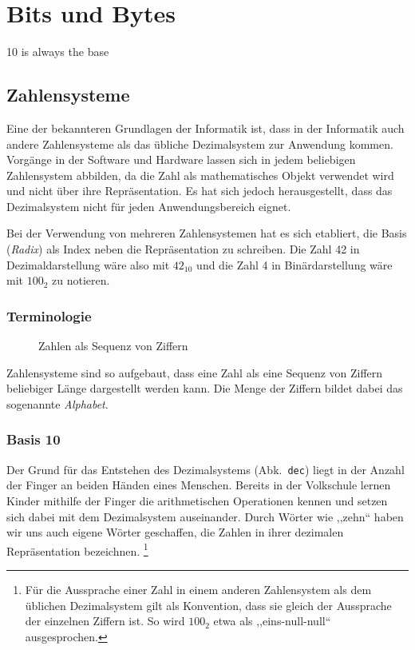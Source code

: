 \chapter{Bits und Bytes}
\epigraph{10 is always the base}{}
\newcommand{\short}[1]{Abk.~\texttt{#1}}
%
\section{Zahlensysteme}
%
Eine der bekannteren Grundlagen der Informatik ist, dass in der Informatik
auch andere Zahlensysteme als das übliche Dezimalsystem zur Anwendung kommen.
Vorgänge in der Software und Hardware lassen sich in jedem beliebigen
Zahlensystem abbilden, da die Zahl als mathematisches Objekt verwendet wird
und nicht über ihre Repräsentation. Es hat sich jedoch herausgestellt, dass das
Dezimalsystem nicht für jeden Anwendungsbereich eignet.

Bei der Verwendung von mehreren Zahlensystemen hat es sich etabliert,
die Basis (\emph{Radix}) als Index neben die Repräsentation zu schreiben.
Die Zahl 42 in Dezimaldarstellung wäre also mit $42_{10}$ und die Zahl 4
in Binärdarstellung wäre mit $100_2$ zu notieren.
%
\subsection{Terminologie}
%
\begin{figure}[ht]
  \begin{center}
  \end{center}
  \caption{Zahlen als Sequenz von Ziffern}
  \label{fig:seq_digits}
\end{figure}

Zahlensysteme sind so aufgebaut, dass eine Zahl als eine Sequenz von Ziffern
beliebiger Länge dargestellt werden kann. Die Menge der Ziffern bildet dabei
das sogenannte \emph{Alphabet}.

\subsection{Basis 10}
\label{sec:bits_numeric_systems_10}
%
Der Grund für das Entstehen des Dezimalsystems (\short{dec}) liegt in der
Anzahl der Finger an beiden Händen eines Menschen. Bereits in der Volkschule
lernen Kinder mithilfe der Finger die arithmetischen Operationen kennen und
setzen sich dabei mit dem Dezimalsystem auseinander. Durch Wörter wie ,,zehn``
haben wir uns auch eigene Wörter geschaffen, die Zahlen in ihrer dezimalen
Repräsentation bezeichnen.%
\footnote{Für die Aussprache einer Zahl in einem anderen Zahlensystem als dem
üblichen Dezimalsystem gilt als Konvention, dass sie gleich der Aussprache der
einzelnen Ziffern ist. So wird $100_2$ etwa als ,,eins-null-null`` ausgesprochen.}

